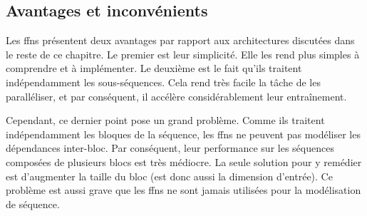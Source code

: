 \subsection{Avantages et inconvénients}

Les \glspl{ffn} présentent deux avantages par rapport aux architectures discutées dans le reste de ce chapitre.
Le premier est leur simplicité. 
Elle les rend plus simples à comprendre et à implémenter.
Le deuxième est le fait qu'ils traitent indépendamment les sous-séquences.
Cela rend très facile la tâche de les paralléliser, 
et par conséquent, il accélère considérablement leur entraînement.

Cependant, ce dernier point pose un grand problème.
Comme ils traitent indépendamment les bloques de la séquence, 
les \glspl{ffn} ne peuvent pas modéliser les dépendances inter-bloc.
Par conséquent, leur performance sur les séquences composées de plusieurs blocs est très médiocre.
La seule solution pour y remédier est d'augmenter la taille du bloc (est donc aussi la dimension d'entrée).
Ce problème est aussi grave que les \glspl{ffn} ne sont jamais utilisées pour la modélisation de séquence.
